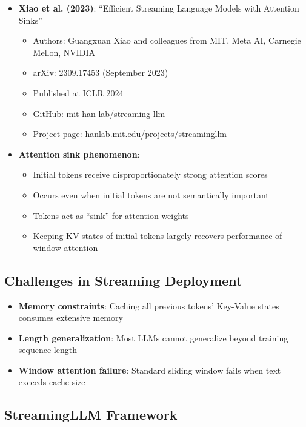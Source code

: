 \documentclass[11pt,letterpaper]{article}
\begin{document}
\begin{itemize}[leftmargin=*]
    \item \textbf{Xiao et al. (2023)}: ``Efficient Streaming Language Models with Attention Sinks''
    \begin{itemize}
        \item Authors: Guangxuan Xiao and colleagues from MIT, Meta AI, Carnegie Mellon, NVIDIA
        \item arXiv: 2309.17453 (September 2023)
        \item Published at ICLR 2024
        \item GitHub: mit-han-lab/streaming-llm
        \item Project page: hanlab.mit.edu/projects/streamingllm
    \end{itemize}

    \item \textbf{Attention sink phenomenon}:
    \begin{itemize}
        \item Initial tokens receive disproportionately strong attention scores
        \item Occurs even when initial tokens are not semantically important
        \item Tokens act as ``sink'' for attention weights
        \item Keeping KV states of initial tokens largely recovers performance of window attention
    \end{itemize}
\end{itemize}

\subsection{Challenges in Streaming Deployment}

\begin{itemize}[leftmargin=*]
    \item \textbf{Memory constraints}: Caching all previous tokens' Key-Value states consumes extensive memory
    \item \textbf{Length generalization}: Most LLMs cannot generalize beyond training sequence length
    \item \textbf{Window attention failure}: Standard sliding window fails when text exceeds cache size
\end{itemize}

\subsection{StreamingLLM Framework}
\end{document}
